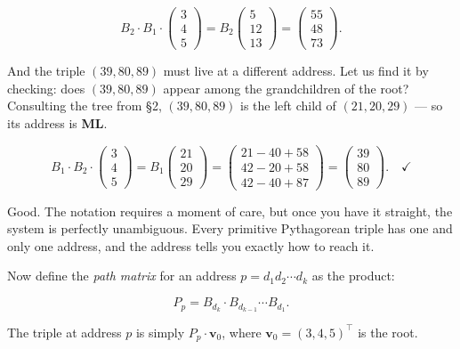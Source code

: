 \[B_2 \cdot B_1 \cdot \begin{pmatrix} 3 \\ 4 \\ 5 \end{pmatrix} = B_2 \begin{pmatrix} 5 \\ 12 \\ 13 \end{pmatrix} = \begin{pmatrix} 55 \\ 48 \\ 73 \end{pmatrix}.\]

And the triple \((39, 80, 89)\) must live at a different address. Let us find it by checking: does \((39, 80, 89)\) appear among the grandchildren of the root? Consulting the tree from §2, \((39, 80, 89)\) is the left child of \((21, 20, 29)\) --- so its address is \textbf{ML}.

\[B_1 \cdot B_2 \cdot \begin{pmatrix} 3 \\ 4 \\ 5 \end{pmatrix} = B_1 \begin{pmatrix} 21 \\ 20 \\ 29 \end{pmatrix} = \begin{pmatrix} 21 - 40 + 58 \\ 42 - 20 + 58 \\ 42 - 40 + 87 \end{pmatrix} = \begin{pmatrix} 39 \\ 80 \\ 89 \end{pmatrix}. \quad \checkmark\]

Good. The notation requires a moment of care, but once you have it straight, the system is perfectly unambiguous. Every primitive Pythagorean triple has one and only one address, and the address tells you exactly how to reach it.

Now define the \emph{path matrix} for an address \(p = d_1 d_2 \cdots d_k\) as the product:

\[P_p = B_{d_k} \cdot B_{d_{k-1}} \cdots B_{d_1}.\]

The triple at address \(p\) is simply \(P_p \cdot \mathbf{v}_0\), where \(\mathbf{v}_0 = (3, 4, 5)^\top\) is the root.

